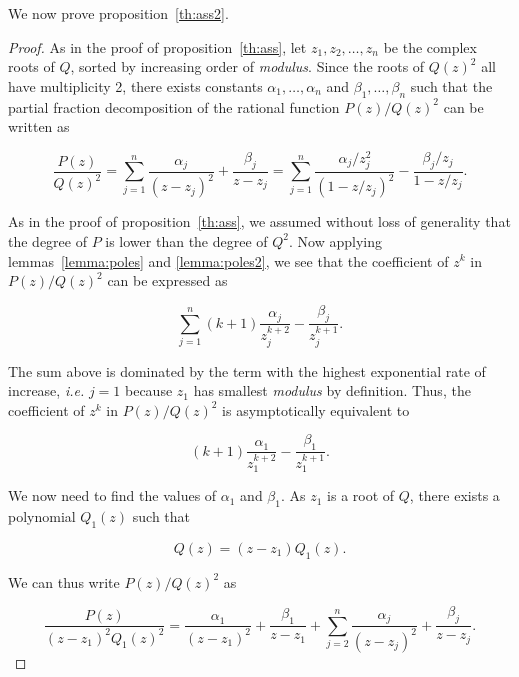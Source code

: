 \documentclass{article}
\begin{document}
We now prove proposition~\ref{th:ass2}.

\begin{proof}
As in the proof of proposition~\ref{th:ass}, let $z_1, z_2, \ldots, z_n$
be the complex roots of $Q$, sorted by increasing order of
\textit{modulus}. Since the roots of $Q(z)^2$ all have multiplicity 2,
there exists constants $\alpha_1, \ldots, \alpha_n$ and $\beta_1, \ldots,
\beta_n$ such that the partial fraction decomposition of the rational
function $P(z)/Q(z)^2$ can be written as

\begin{equation*}
\frac{P(z)}{Q(z)^2} = 
\sum_{j=1}^n \frac{\alpha_j}{(z-z_j)^2} + \frac{\beta_j}{z-z_j} =
\sum_{j=1}^n \frac{\alpha_j/z_j^2}{(1-z/z_j)^2}
-\frac{\beta_j/z_j}{1-z/z_j}.
\end{equation*}

As in the proof of proposition~\ref{th:ass}, we assumed without loss of
generality that the degree of $P$ is lower than the degree of $Q^2$. Now
applying lemmas~\ref{lemma:poles} and \ref{lemma:poles2}, we see that the
coefficient of $z^k$ in $P(z)/Q(z)^2$ can be expressed as

\begin{equation}
\label{eq:fullass2}
\sum_{j=1}^n (k+1)\frac{\alpha_j}{z_j^{k+2}}-\frac{\beta_j}{z_j^{k+1}}.
\end{equation}

The sum above is dominated by the term with the highest exponential rate
of increase, \textit{i.e.} $j=1$ because $z_1$ has smallest
\textit{modulus} by definition. Thus, the coefficient of $z^k$ in
$P(z)/Q(z)^2$ is asymptotically equivalent to 

\begin{equation*}
(k+1)\frac{\alpha_1}{z_1^{k+2}}-\frac{\beta_1}{z_1^{k+1}}.
\end{equation*}

We now need to find the values of $\alpha_1$ and $\beta_1$. As $z_1$ is a
root of $Q$, there exists a polynomial $Q_1(z)$ such that

\begin{equation}
\label{eq:Q1}
Q(z) = (z-z_1)Q_1(z).
\end{equation}

We can thus write $P(z)/Q(z)^2$ as

\begin{equation}
\label{eq:misc1}
\frac{P(z)}{(z-z_1)^2Q_1(z)^2} = \frac{\alpha_1}{(z-z_1)^2} +
\frac{\beta_1}{z-z_1} +
\sum_{j=2}^n \frac{\alpha_j}{(z-z_j)^2} + \frac{\beta_j}{z-z_j}.
\end{equation}


\end{proof}
\end{document}
